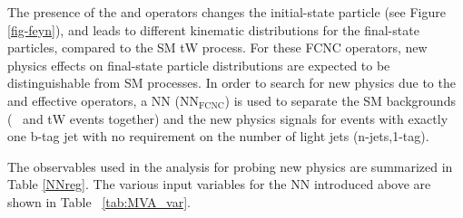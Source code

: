 The presence of the \OuG and \OcG operators changes the initial-state particle (see Figure \ref{fig-feyn}), and leads to different kinematic distributions for the final-state particles, compared to the SM tW process.
For these FCNC operators, new physics effects on final-state particle distributions are expected to be distinguishable from SM processes.
In order to search for new physics due to the \OuG and \OcG effective operators, a NN (NN$_{\text{FCNC}}$) is used to separate the SM backgrounds (\ttbar~ and tW events together) and the new physics signals for events with exactly one b-tag jet with no requirement on the number of light jets (n-jets,1-tag).

The observables used in the analysis for probing new physics are summarized in Table \ref{NNreg}.
The various input variables for the NN introduced above are shown in Table ~\ref{tab:MVA_var}.


\begin{table}[h]
\centering
{}
\caption{Summary of the observables used for probing effective couplings  in various (n-jets,m-tags) categories in the ee and \mumu channels.}
\label{NNreg}
\end{table}



